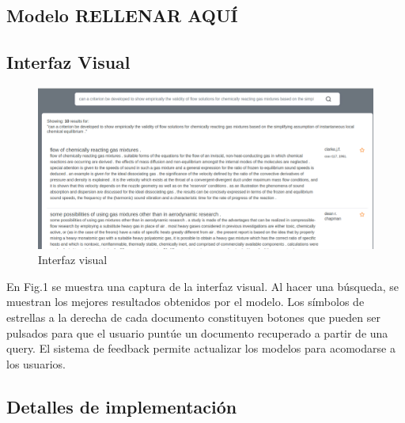 \documentclass[runningheads,a4paper]{llncs}
\begin{document}
\subsection*{Modelo RELLENAR AQUÍ}

\subsection*{Interfaz Visual}

\begin{figure}
	\centering
	\includegraphics[width=0.7\linewidth]{./visual-1.png}
	\caption{Interfaz visual}
	\label{fig:3}
\end{figure}

En Fig.1 se muestra una captura de la interfaz visual. Al hacer una búsqueda, se muestran los mejores resultados obtenidos por el modelo. Los símbolos de estrellas a la derecha de cada documento constituyen botones que pueden ser pulsados para que el usuario puntúe un documento recuperado a partir de una query. El sistema de feedback permite actualizar los modelos para acomodarse a los usuarios.

\subsection{Detalles de implementación} 
\end{document}
